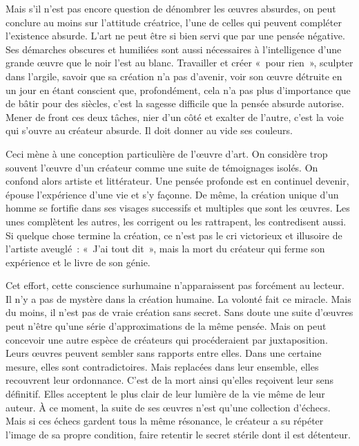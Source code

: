 \documentclass{book}
\begin{document}
Mais s'il n'est pas encore question de dénombrer les œuvres absurdes, on peut conclure au moins sur l'attitude créatrice, l'une de celles qui peuvent compléter l'existence absurde. L'art ne peut être si bien servi que par une pensée négative. Ses démarches obscures et humiliées sont aussi nécessaires à l'intelligence d'une grande œuvre que le noir l'est au blanc. Travailler et créer « pour rien », sculpter dans l'argile, savoir que sa création n'a pas d'avenir, voir son œuvre détruite en un jour en étant conscient que, profondément, cela n'a pas plus d'importance que de bâtir pour des siècles, c'est la sagesse difficile que la pensée absurde autorise. Mener de front ces deux tâches, nier d'un côté et exalter de l'autre, c'est la voie qui s'ouvre au créateur absurde. Il doit donner au vide ses couleurs.

Ceci mène à une conception particulière de l'œuvre d'art. On considère trop souvent l'œuvre d'un créateur comme une suite de témoignages isolés. On confond alors artiste et littérateur. Une pensée profonde est en continuel devenir, épouse l'expérience d'une vie et s'y façonne. De même, la création unique d'un homme se fortifie dans ses visages successifs et multiples que sont les œuvres. Les unes complètent les autres, les corrigent ou les rattrapent, les contredisent aussi. Si quelque chose termine la création, ce n'est pas le cri victorieux et illusoire de l'artiste aveuglé : « J'ai tout dit », mais la mort du créateur qui ferme son expérience et le livre de son génie.

Cet effort, cette conscience surhumaine n'apparaissent pas forcément au lecteur. Il n'y a pas de mystère dans la création humaine. La volonté fait ce miracle. Mais du moins, il n'est pas de vraie création sans secret. Sans doute une suite d'œuvres peut n'être qu'une série d'approximations de la même pensée. Mais on peut concevoir une autre espèce de créateurs qui procéderaient par juxtaposition. Leurs œuvres peuvent sembler sans rapports entre elles. Dans une certaine mesure, elles sont contradictoires. Mais replacées dans leur ensemble, elles recouvrent leur ordonnance. C'est de la mort ainsi qu'elles reçoivent leur sens définitif. Elles acceptent le plus clair de leur lumière de la vie même de leur auteur. À ce moment, la suite de ses œuvres n'est qu'une collection d'échecs. Mais si ces échecs gardent tous la même résonance, le créateur a su répéter l'image de sa propre condition, faire retentir le secret stérile dont il est détenteur.
\end{document}
